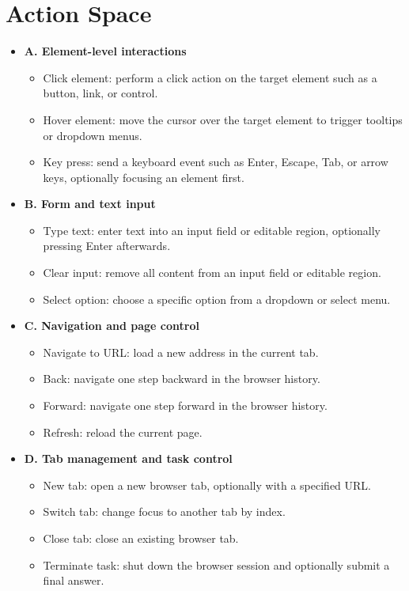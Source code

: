 \documentclass{article}
\begin{document}
\section{Action Space}
\label{sec:action-space}
\begin{itemize}[leftmargin=*]

\item {\textbf{A. Element-level interactions}}
  \begin{itemize}[leftmargin=*]
    \item {Click element}: perform a click action on the target element such as a button, link, or control.  
    \item {Hover element}: move the cursor over the target element to trigger tooltips or dropdown menus.  
    \item {Key press}: send a keyboard event such as Enter, Escape, Tab, or arrow keys, optionally focusing an element first.  
  \end{itemize}

\item {\textbf{B. Form and text input}}
  \begin{itemize}[leftmargin=*]
    \item {Type text}: enter text into an input field or editable region, optionally pressing Enter afterwards.  
    \item {Clear input}: remove all content from an input field or editable region.  
    \item {Select option}: choose a specific option from a dropdown or select menu.  
  \end{itemize}

\item {\textbf{C. Navigation and page control}}
  \begin{itemize}[leftmargin=*]
    \item {Navigate to URL}: load a new address in the current tab.  
    \item {Back}: navigate one step backward in the browser history.  
    \item {Forward}: navigate one step forward in the browser history.  
    \item {Refresh}: reload the current page.  
  \end{itemize}

\item {\textbf{D. Tab management and task control}}
  \begin{itemize}[leftmargin=*]
    \item {New tab}: open a new browser tab, optionally with a specified URL.  
    \item {Switch tab}: change focus to another tab by index.  
    \item {Close tab}: close an existing browser tab.  
    \item {Terminate task}: shut down the browser session and optionally submit a final answer.
  \end{itemize}

\end{itemize}
\end{document}
